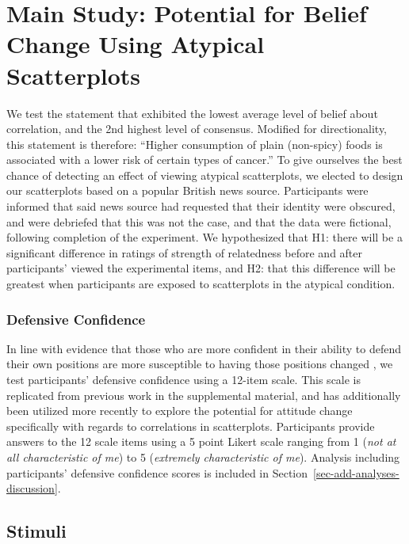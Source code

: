 \documentclass[manuscript,screen,review]{acmart}
\begin{document}
\section{Main Study: Potential for Belief Change Using Atypical
Scatterplots}\label{sec-main-study}

We test the statement that exhibited the lowest average level of belief
about correlation, and the 2nd highest level of consensus. Modified for
directionality, this statement is therefore: ``Higher consumption of
plain (non-spicy) foods is associated with a lower risk of certain types
of cancer.'' To give ourselves the best chance of detecting an effect of
viewing atypical scatterplots, we elected to design our scatterplots
based on a popular British news source. Participants were informed that
said news source had requested that their identity were obscured, and
were debriefed that this was not the case, and that the data were
fictional, following completion of the experiment. We hypothesized that
H1: there will be a significant difference in ratings of strength of
relatedness before and after participants' viewed the experimental
items, and H2: that this difference will be greatest when participants
are exposed to scatterplots in the atypical condition.

\subsubsection{Defensive Confidence}\label{sec-def-con}

In line with evidence that those who are more confident in their ability
to defend their own positions are more susceptible to having those
positions changed \citep{albarracin_2004}, we test participants'
defensive confidence using a 12-item scale. This scale is replicated
from previous work in the supplemental material, and has additionally
been utilized more recently \citep{markant_2023} to explore the
potential for attitude change specifically with regards to correlations
in scatterplots. Participants provide answers to the 12 scale items
using a 5 point Likert scale ranging from 1 (\emph{not at all
characteristic of me}) to 5 (\emph{extremely characteristic of me}).
Analysis including participants' defensive confidence scores is included
in Section~\ref{sec-add-analyses-discussion}.

\subsection{Stimuli}\label{sec-stimuli-main}
\end{document}
